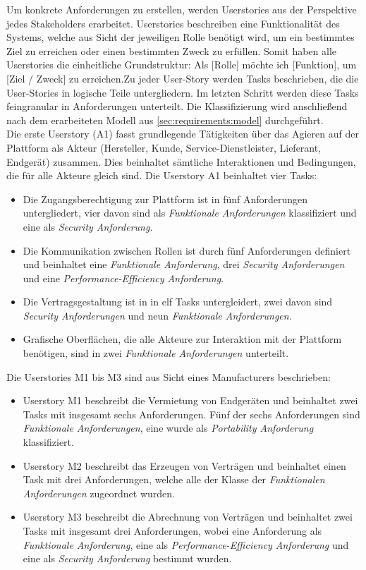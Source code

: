 Um konkrete Anforderungen zu erstellen, werden Userstories aus der Perspektive jedes Stakeholders erarbeitet. Userstories beschreiben eine Funktionalität des Systems, welche aus Sicht der jeweiligen Rolle benötigt wird, um ein bestimmtes Ziel zu erreichen oder einen bestimmten Zweck zu erfüllen. Somit haben alle Userstories die einheitliche Grundstruktur: \glqq Als [Rolle] möchte ich [Funktion], um [Ziel / Zweck] zu erreichen.\grqq Zu jeder User-Story werden Tasks beschrieben, die die User-Stories in logische Teile untergliedern. Im letzten Schritt werden diese Tasks feingranular in Anforderungen unterteilt. Die Klassifizierung wird anschließend nach dem erarbeiteten Modell aus \ref{sec:requirements:model} durchgeführt.\\

Die erste Userstory (A1) fasst grundlegende Tätigkeiten über das Agieren auf der Plattform als Akteur (Hersteller, Kunde, Service-Dienstleister, Lieferant, Endgerät) zusammen. Dies beinhaltet sämtliche Interaktionen und Bedingungen, die für alle Akteure gleich sind. Die Userstory A1 beinhaltet vier Tasks:
\begin{itemize}
  \item Die Zugangsberechtigung zur Plattform ist in fünf Anforderungen untergliedert, vier davon sind als \textit{Funktionale Anforderungen} klassifiziert und eine als \textit{Security Anforderung}.
  \item Die Kommunikation zwischen Rollen ist durch fünf Anforderungen definiert und beinhaltet eine \textit{Funktionale Anforderung}, drei \textit{Security Anforderungen} und eine \textit{Performance-Efficiency Anforderung}.
  \item Die Vertragsgestaltung ist in in elf Tasks untergleidert, zwei davon sind \textit{Security Anforderungen} und neun \textit{Funktionale Anforderungen}.
  \item Grafische Oberflächen, die alle Akteure zur Interaktion mit der Plattform benötigen, sind in zwei \textit{Funktionale Anforderungen} unterteilt.
\end{itemize}

Die Userstories M1 bis M3 sind aus Sicht eines Manufacturers beschrieben:
\begin{itemize}
  \item Userstory M1 beschreibt die Vermietung von Endgeräten und beinhaltet zwei Tasks mit insgesamt sechs Anforderungen. Fünf der sechs Anforderungen sind \textit{Funktionale Anforderungen}, eine wurde als \textit{Portability Anforderung} klassifiziert.
  \item Userstory M2 beschreibt das Erzeugen von Verträgen und beinhaltet einen Task mit drei Anforderungen, welche alle der Klasse der \textit{Funktionalen Anforderungen} zugeordnet wurden.
  \item Userstory M3 beschreibt die Abrechnung von Verträgen und beinhaltet zwei Tasks mit insgesamt drei Anforderungen, wobei eine Anforderung als \textit{Funktionale Anforderung}, eine als \textit{Performance-Efficiency Anforderung} und eine als \textit{Security Anforderung} bestimmt wurden.
\end{itemize}

